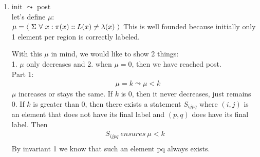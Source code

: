 \documentclass{article}
\begin{document}
\begin{enumerate}


\item
init $\leadsto$ post\\
let's define $\mu$:\\
$\mu = \langle \ \Sigma \ \forall \ x : \pi(x) :: L(x) \neq \lambda(x) \ \rangle\\$
This is well founded because initially only 1 element per region is correctly labeled.

With this $\mu$ in mind, we would like to show 2 things:\\
1. $\mu$ only decreases and 2. when $\mu=0$, then we have reached post.\\

Part 1:\\
\begin{align*}
&\mu = k \leadsto \mu < k
\end{align*}
$\mu$ increases or stays the same. If $k$ is 0, then it never decreases, just remains 0. If $k$ is greater than 0, then there exists a statement $S_{ijpq}$ where $(i,j)$ is an element that does not have its final label and $(p,q)$ does have its final label. Then\\
\begin{align*}
S_{ijpq} \ ensures \ \mu < k\\
\end{align*}
By invariant 1 we know that such an element pq always exists.\\

\iffalse
\begin{align*}
&\emph{Let's say that:}\\
&\pi(x)=(i,j) \wedge L(x)\neq \lambda(x) \wedge \pi(y)=(p,q) \wedge L(y)=\lambda(y)\\
&\emph{then}\\
&L(i,j) := min(L(i,j),L(p,q)) \ if \ SameRegion((i,j),(p,q)) \ ensures \ L(x)=\lambda(x)\\
&\emph{and}\\
&\langle \forall x \ : \pi(x)=(i,j) \ :: \exists \ i,j : 0 \leq i,j \leq N :: L(x)=\lambda(x) \ \rangle\\
\end{align*}
meaning that if x does not have its final label and y does have its final label, then we can select the assignment statement that takes x and y, and this statement ensures that $\mu$ decreases.\\
Additionally, there always exists such a $y$ that $L(y)=\lambda(y)$, because at least one element is set to the minimum label in its region.\\
\fi


\end{enumerate}
\end{document}
